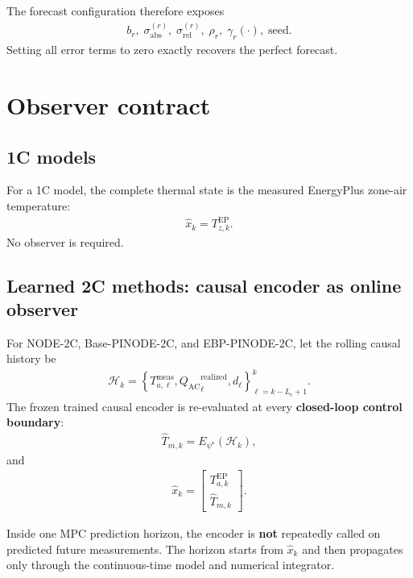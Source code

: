 \documentclass[11pt]{article}
\newcommand{\QAC}{Q_{\mathrm{AC}}}
\begin{document}
The forecast configuration therefore exposes
\begin{align}
\boxed{
b_r,\;
\sigma^{(r)}_{\mathrm{abs}},\;
\sigma^{(r)}_{\mathrm{rel}},\;
\rho_r,\;
\gamma_r(\cdot),\;
\mathrm{seed}.
}
\tag{6.46}
\end{align}
Setting all error terms to zero exactly recovers the perfect forecast.

\section{Observer contract}

\subsection{1C models}

For a 1C model, the complete thermal state is the measured EnergyPlus zone-air temperature:
\begin{align}
\boxed{
\widehat x_k
=
T_{z,k}^{\mathrm{EP}}.
}
\tag{6.47}
\end{align}
No observer is required.

\subsection{Learned 2C methods: causal encoder as online observer}

For NODE-2C, Base-PINODE-2C, and EBP-PINODE-2C, let the rolling causal history be
\begin{align}
\mathcal H_k
=
\left\{
T_{a,\ell}^{\mathrm{meas}},
{\QAC}_{\ell}^{\mathrm{realized}},
d_\ell
\right\}_{\ell=k-L_e+1}^{k}.
\tag{6.48}
\end{align}
The frozen trained causal encoder is re-evaluated at every \textbf{closed-loop control boundary}:
\begin{align}
\boxed{
\widehat T_{m,k}
=
E_{\psi^\star}(\mathcal H_k),
}
\tag{6.49}
\end{align}
and
\begin{align}
\boxed{
\widehat x_k
=
\begin{bmatrix}
T_{a,k}^{\mathrm{EP}}\\
\widehat T_{m,k}
\end{bmatrix}.
}
\tag{6.50}
\end{align}

Inside one MPC prediction horizon, the encoder is \textbf{not} repeatedly called on predicted
future measurements.  The horizon starts from \(\widehat x_k\) and then propagates only through
the continuous-time model and numerical integrator.
\end{document}

